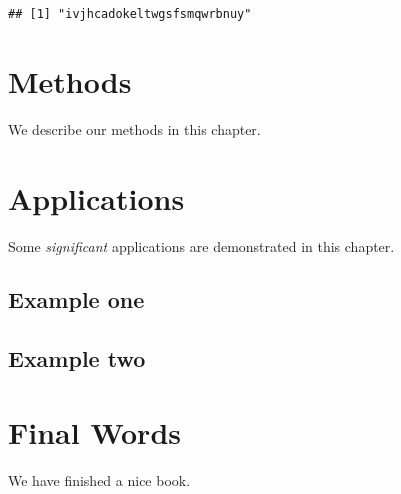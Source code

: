 \documentclass[]{book}
\theoremstyle{definition}
\theoremstyle{definition}
\theoremstyle{definition}
\theoremstyle{remark}
\begin{document}
\begin{verbatim}
## [1] "ivjhcadokeltwgsfsmqwrbnuy"
\end{verbatim}

\chapter{Methods}\label{methods}

We describe our methods in this chapter.

\chapter{Applications}\label{applications}

Some \emph{significant} applications are demonstrated in this chapter.

\section{Example one}\label{example-one}

\section{Example two}\label{example-two}

\chapter{Final Words}\label{final-words}

We have finished a nice book.


\end{document}
